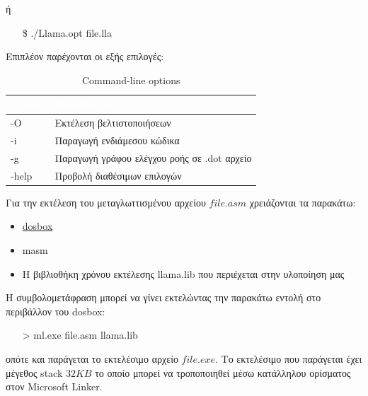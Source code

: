 \documentclass[12pt]{article}
\begin{document}
ή

\begin{itemize}
\item[\$] ./Llama.opt file.lla
\end{itemize}

Επιπλέον παρέχονται οι εξής επιλογές:

\begin{table}[htbp]
\centering
\begin{tabular}{|l|l|}
\hline
   \rowcolor{ablack}
    \textcolor{white}{Option} & \textcolor{white}{Description} \\ \hline
    
    \rowcolor{gray}
    -O & Εκτέλεση βελτιστοποιήσεων \\ 
    
    -i & Παραγωγή ενδιάμεσου κώδικα \\ 
    
     \rowcolor{gray}
    -g & Παραγωγή γράφου ελέγχου ροής σε .dot αρχείο \\
    
    -help & Προβολή διαθέσιμων επιλογών \\ 
    
\hline
\end{tabular}
\caption{Command-line options}
\end{table}

Για την εκτέλεση του μεταγλωττισμένου αρχείου $file.asm$ χρειάζονται τα παρακάτω:
\begin{itemize}
\item \href{http://www.dosbox.com/}{dosbox}
\item masm
\item Η βιβλιοθήκη χρόνου εκτέλεσης llama.lib που περιέχεται στην υλοποίηση μας
\end{itemize}

Η συμβολομετάφραση μπορεί να γίνει εκτελώντας την παρακάτω εντολή στο περιβάλλον του dosbox:
\begin{itemize}
\item[>] ml.exe file.asm llama.lib
\end{itemize} 
οπότε και παράγεται το εκτελέσιμο αρχείο $file.exe$.
Το εκτελέσιμο που παράγεται έχει μέγεθος stack $32KB$ το οποίο μπορεί να τροποποιηθεί μέσω κατάλληλου ορίσματος στον Microsoft Linker.
%
%
%
%
%
%
%
%
%
%
%    
%    
%
%
%
%
%
%	
\end{document}
